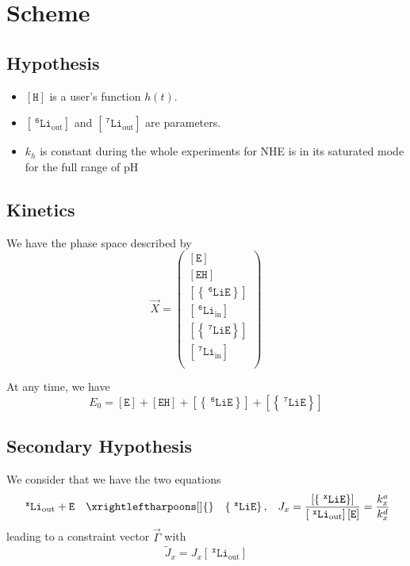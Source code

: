 \documentclass[aps,onecolumn,10pt]{revtex4}
\newcommand{\mychem}[1]{\mathtt{#1}}
\newcommand{\myconc}[1]{\left\lbrack{#1}\right\rbrack}
\newcommand{\spLi}[1]{{~^{\mychem{#1}}\mychem{Li}}}
\newcommand{\spEout}{\mychem{E}}
\newcommand{\Eout}{\myconc{\spEout}}
\newcommand{\spLiE}[1]{\left\lbrace\spLi{#1}\spEout\right\rbrace}
\newcommand{\LiE}[1]{\myconc{\spLiE{#1}}}
\newcommand{\spLiIn}[1]{{\spLi{#1}}_{\mathrm{in}}}
\newcommand{\LiIn}[1]{\myconc{\spLiIn{#1}}}
\newcommand{\spLiOut}[1]{{\spLi{#1}}_{\mathrm{out}}}
\newcommand{\LiOut}[1]{\myconc{\spLiOut{#1}}}
\newcommand{\spEHin}{\mychem{EH}}
\newcommand{\EHin}{\myconc{\spEHin}}
\newcommand{\spproton}{\mychem{H}}
\newcommand{\proton}{\myconc{\spproton}}
\begin{document}
\section{Scheme}

\subsection{Hypothesis}
\begin{itemize}
\item $\proton$ is a  user's function $h(t)$.
\item $\LiOut{6}$ and  $\LiOut{7}$ are parameters.
\item $k_h$ is constant during the whole experiments for NHE is in its saturated mode for the full range of pH
\end{itemize}

\subsection{Kinetics}
We have the phase space described by
\begin{equation}
 \vec{X} = 
        \begin{pmatrix}
        \Eout\\
        \EHin\\
        \LiE{6}\\
        \LiIn{6}\\
        \LiE{7}\\
        \LiIn{7}\\
        \end{pmatrix}
\end{equation}

At any time, we  have
\begin{equation} 
	\label{eq:E0}
	E_0 = \Eout + \EHin +  \LiE{6} + \LiE{7}
\end{equation}

\subsection{Secondary Hypothesis}
We consider that we have the two equations
\begin{equation}
	\begin{array}{rcll}
	 \spLiOut{x} +  \spEout &  \xrightleftharpoons[]{} & \spLiE{x}, & J_x = \dfrac{\LiE{x}}{\LiOut{x} \Eout} = \dfrac{k_x^a}{k_x^d}\\
	 \end{array}
\end{equation}
leading to a constraint vector $\vec{\Gamma}$
with 
\begin{equation}
	\tilde{J}_x = J_x \LiOut{x}
\end{equation}
\end{document}

